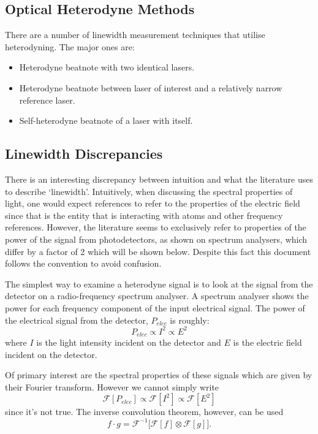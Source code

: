 \subsection{Optical Heterodyne Methods}

There are a number of linewidth measurement techniques that utilise heterodyning. The major ones are:
\begin{itemize}
\item Heterodyne beatnote with two identical lasers.
\item Heterodyne beatnote between laser of interest and a relatively narrow reference laser.
\item Self-heterodyne beatnote of a laser with itself.
\end{itemize}

\subsection{Linewidth Discrepancies}
There is an interesting discrepancy between intuition and what the literature uses to describe `linewidth'.
Intuitively, when discussing the spectral properties of light, one would expect references to refer to the properties of the electric field since that is the entity that is interacting with atoms and other frequency references.
However, the literature seems to exclusively refer to properties of the power of the signal from photodetectors, as shown on spectrum analysers, which differ by a factor of 2 which will be shown below.
Despite this fact this document follows the convention to avoid confusion.

The simplest way to examine a heterodyne signal is to look at the signal from the detector on a radio-frequency spectrum analyser.
A spectrum analyser shows the power for each frequency component of the input electrical signal.
The power of the electrical signal from the detector, $P_{elec}$ is roughly:
\begin{equation}
P_{elec}\propto I^2 \propto E^2
\label{eq:beatnote_proportional}
\end{equation}
where $I$ is the light intensity incident on the detector and $E$ is the electric field incident on the detector.

Of primary interest are the spectral properties of these signals which are given by their Fourier transform.
However we cannot simply write
\begin{equation}
\mathcal{F}[P_{elec}]\propto \mathcal{F}[I^2] \propto \mathcal{F}[E^2]
\end{equation}
since it's not true.
The inverse convolution theorem, however, can be used
\begin{equation}
f\cdot g = \mathcal{F}^{-1} \bigg[ \mathcal{F}[f] \otimes\mathcal{F}[g]\bigg].
\end{equation}

